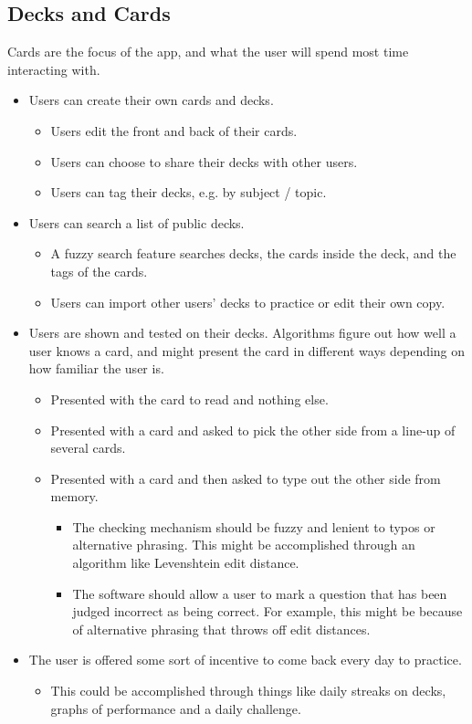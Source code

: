 \documentclass{report}
\begin{document}
\subsection{Decks and Cards}
Cards are the focus of the app, and what the user will spend most time interacting with.
\begin{itemize}
  \item Users can create their own cards and decks.
  \begin{itemize}
    \item Users edit the front and back of their cards.
    \item Users can choose to share their decks with other users.
    \item Users can tag their decks, e.g. by subject / topic.
  \end{itemize}
  \item Users can search a list of public decks.
  \begin{itemize}
    \item A fuzzy search feature searches decks, the cards inside the deck, and the tags of the cards.
    \item Users can import other users' decks to practice or edit their own copy.
  \end{itemize}
  \item Users are shown and tested on their decks. Algorithms figure out how well a user knows a card, and might present the card in different ways depending on how familiar the user is.
  \begin{itemize}
    \item Presented with the card to read and nothing else.
    \item Presented with a card and asked to pick the other side from a line-up of several cards.
    \item Presented with a card and then asked to type out the other side from memory.
    \begin{itemize}
      \item The checking mechanism should be fuzzy and lenient to typos or alternative phrasing. This might be accomplished through an algorithm like Levenshtein edit distance.
      \item The software should allow a user to mark a question that has been judged incorrect as being correct. For example, this might be because of alternative phrasing that throws off edit distances.
    \end{itemize}
  \end{itemize}
  \item The user is offered some sort of incentive to come back every day to practice.
  \begin{itemize}
    \item This could be accomplished through things like daily streaks on decks, graphs of performance and a daily challenge.
  \end{itemize}
\end{itemize}
\end{document}
